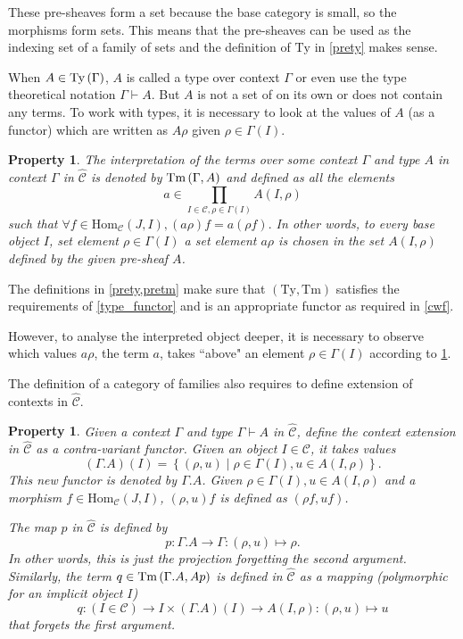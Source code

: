 \documentclass[12pt,a4paper,twoside,xetex]{book} %
\newtheorem{property}[theorem]{Property}
\newcommand{\psh}[1]{\widehat{#1}}
\begin{document}
These pre-sheaves form a set because the base category is small, so the 
morphisms form sets. This means that the pre-sheaves can be used as the indexing 
set of a family of sets and the definition of $\text{Ty}$ in \cref{prety} makes 
sense. 

When $A \in \text{Ty}\left(\Gamma\right)$,  $A$ is called a type over context $\Gamma$ 
or even use the type theoretical notation $\Gamma \vdash A$. But $A$ is not a 
set of on its own or does not contain any terms. To work with types, it is 
necessary to look at the values of $A$ (as a functor) which are written as 
$A\rho$ given $\rho \in \Gamma (I)$.

\begin{property}\label{pretm}
The interpretation of the terms over some context $\Gamma$ and type $A$ in 
context $\Gamma$ in $\psh{\mathcal{C}}$ is denoted by  $\text{Tm}\left(\Gamma,A\right)$ and defined as all the elements $$a 
\in \prod _{I \in \mathcal{C}, \rho \in \Gamma (I)} A(I,\rho)$$ such that 
$\forall f \in \text{Hom}_{\mathcal{C}}(J,I), (a \rho )f = a(\rho f).$ In other 
words, to every base object $I$, set element $\rho \in \Gamma (I)$ a set 
element $a\rho$ is chosen in the set $A(I,\rho)$ defined by the given pre-sheaf 
$A$. 

\end{property}

The definitions in \cref{prety,pretm} make sure that $(\text{Ty},\text{Tm})$  
satisfies the requirements of \cref{type_functor} and is an appropriate functor 
as required in \cref{cwf}.


However, to analyse the interpreted object deeper, it is necessary to 
observe which values $a\rho$, the term $a$, takes ``above" an element $\rho 
\in \Gamma (I)$ according to \cref{pretm}.

The definition of a category of families also requires to define extension 
of contexts in $\psh{\mathcal{C}}$. 

\begin{property}\label{preext}
Given a context $\Gamma$ and type $\Gamma \vdash A$ in $\psh{\mathcal{C}}$, define the context 
extension in $\psh{\mathcal{C}}$ as a contra-variant functor. Given an object $I 
\in \mathcal{C}$, it takes values $$(\Gamma . A)(I) = \left\{ (\rho , u) \mid 
\rho \in \Gamma (I) , u \in A (I, \rho ) \right\}.$$ This new functor is 
denoted by $\Gamma . A$. Given $\rho \in \Gamma (I), u \in A(I,\rho )$ and a 
morphism $f \in \text{Hom}_{\mathcal{C}}(J,I)$, $(\rho, u)f$ is defined as 
$(\rho f, uf)$. 


The map $p$ in $\psh{\mathcal{C}}$ is defined by $$p: \Gamma . A \rightarrow 
\Gamma : (\rho , u ) \mapsto \rho.$$ In other words, this is just the 
projection forgetting the second argument. Similarly, the term $q \in 
\text{Tm}\left(\Gamma . A,Ap\right) $ is defined in $\psh{\mathcal{C}}$ as a mapping 
(polymorphic for an implicit object $I$) $$q: (I \in \mathcal{C}) \rightarrow I 
\times (\Gamma . A)(I) \rightarrow A(I,\rho): (\rho, u) \mapsto u$$ that 
forgets the first argument.
\end{property}
\end{document}
